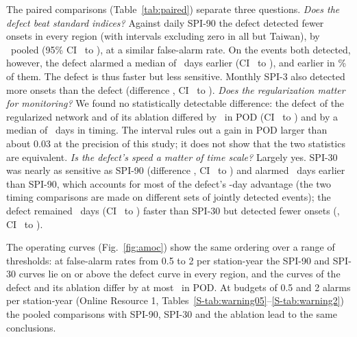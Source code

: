\documentclass[pdflatex,sn-mathphys-ay]{sn-jnl}
\theoremstyle{thmstyletwo}
\begin{document}
The paired comparisons (Table~\ref{tab:paired}) separate three questions. \emph{Does the defect beat
standard indices?} Against daily SPI-90 the defect detected fewer onsets in every region (with
intervals excluding zero in all but Taiwan), by
\dpodallDoneDthree\ pooled (95\% CI \dpodloallDoneDthree\ to \dpodhiallDoneDthree), at a similar
false-alarm rate. On the events both detected, however, the defect alarmed a median of
\dtimallDoneDthree\ days earlier (CI \dtimloallDoneDthree\ to \dtimhiallDoneDthree), and earlier in
\fearlyallDoneDthree\% of them. The defect is thus faster but less sensitive. Monthly SPI-3 also
detected more onsets than the defect (difference \spithreedrydpodall, CI \spithreedrydpodloall\ to
\spithreedrydpodhiall). \emph{Does the regularization
matter for monitoring?} We found no statistically detectable difference: the defect of the regularized
network and of its ablation differed by \dpodallDoneDtwo\ in POD (CI \dpodloallDoneDtwo\ to
\dpodhiallDoneDtwo) and by a median of \dtimallDoneDtwo\ days in timing. The interval rules out a gain in
POD larger than about 0.03 at the precision of this study; it does not show that the two statistics are
equivalent. \emph{Is the defect's speed a matter of time scale?} Largely yes. SPI-30
was nearly as sensitive as SPI-90 (difference \dpodallDsevenDthree, CI \dpodloallDsevenDthree\ to
\dpodhiallDsevenDthree) and alarmed \dtimallDsevenDthree\ days earlier than SPI-90, which accounts for
most of the defect's \dtimallDoneDthree-day advantage (the two timing comparisons are made on different
sets of jointly detected events); the defect remained \dtimallDoneDseven\ days
(CI \dtimloallDoneDseven\ to \dtimhiallDoneDseven) faster than SPI-30 but detected fewer onsets
(\dpodallDoneDseven, CI \dpodloallDoneDseven\ to \dpodhiallDoneDseven).



The operating curves (Fig.~\ref{fig:amoc}) show the same ordering over a range of thresholds: at
false-alarm rates from 0.5 to 2 per station-year the SPI-90 and SPI-30 curves lie on or above the
defect curve in every region, and the curves of the defect and its ablation differ by at most
\amocDoneDtwomaxdiff\ in POD. At budgets of 0.5 and 2 alarms per station-year (Online Resource 1,
Tables~\ref{S-tab:warning05}--\ref{S-tab:warning2}) the pooled comparisons with SPI-90, SPI-30 and the
ablation lead to the same conclusions.
\end{document}
